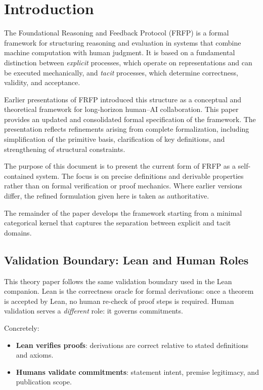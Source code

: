 \section{Introduction}
\label{ch:intro}

The Foundational Reasoning and Feedback Protocol (FRFP) is a formal framework for structuring
reasoning and evaluation in systems that combine machine computation with human judgment. It
is based on a fundamental distinction between \emph{explicit} processes, which operate on
representations and can be executed mechanically, and \emph{tacit} processes, which determine
correctness, validity, and acceptance.

Earlier presentations of FRFP introduced this structure as a conceptual and theoretical framework
for long-horizon human--AI collaboration. This paper provides an updated and consolidated formal
specification of the framework. The presentation reflects refinements arising from complete
formalization, including simplification of the primitive basis, clarification of key definitions,
and strengthening of structural constraints.

The purpose of this document is to present the current form of FRFP as a self-contained system.
The focus is on precise definitions and derivable properties rather than on formal verification or proof
mechanics. Where earlier versions differ, the refined formulation given here is taken as authoritative.

The remainder of the paper develops the framework starting from a minimal categorical kernel
that captures the separation between explicit and tacit domains.

\subsection*{Validation Boundary: Lean and Human Roles}

This theory paper follows the same validation boundary used in the Lean companion.
Lean is the correctness oracle for formal derivations: once a theorem is accepted by
Lean, no human re-check of proof steps is required. Human validation serves a
\emph{different} role: it governs commitments.

Concretely:
\begin{itemize}
  \item \textbf{Lean verifies proofs}: derivations are correct relative to stated definitions and axioms.
  \item \textbf{Humans validate commitments}: statement intent, premise legitimacy, and publication scope.
\end{itemize}

